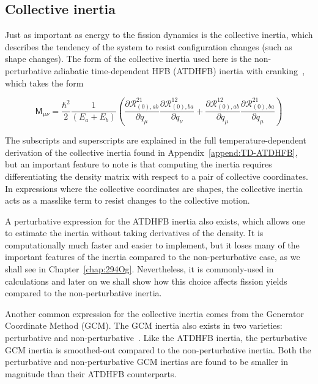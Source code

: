 \subsection{Collective inertia}
Just as important as energy to the fission dynamics is the collective inertia, which describes the tendency of the system to resist configuration changes (such as shape changes). The form of the collective inertia used here is the non-perturbative adiabatic time-dependent HFB (ATDHFB) inertia with cranking~\cite{Baran2011}, which takes the form

\begin{equation}\label{eq:mATDHFB-np}
\mathsf{M}_{\mu\nu} =  \frac{\hbar^2}{2}\frac{1}{(E_a+E_b)}\left(\frac{\partial\mathcal{R}^{21}_{(0),ab}}{\partial q_\mu}\frac{\partial\mathcal{R}^{12}_{(0),ba}}{\partial q_\nu}+\frac{\partial\mathcal{R}^{12}_{(0),ab}}{\partial q_\mu}\frac{\partial\mathcal{R}^{21}_{(0),ba}}{\partial q_\mu}\right)
\end{equation}

\noindent The subscripts and superscripts are explained in the full temperature-dependent derivation of the collective inertia found in Appendix~\ref{append:TD-ATDHFB}, but an important feature to note is that computing the inertia requires differentiating the density matrix with respect to a pair of collective coordinates. In expressions where the collective coordinates are shapes, the collective inertia acts as a masslike term to resist changes to the collective motion.

A perturbative expression for the ATDHFB inertia also exists, which allows one to estimate the inertia without taking derivatives of the density. It is computationally much faster and easier to implement, but it loses many of the important features of the inertia compared to the non-perturbative case, as we shall see in Chapter~\ref{chap:294Og}. Nevertheless, it is commonly-used in calculations and later on we shall show how this choice affects fission yields compared to the non-perturbative inertia.

Another common expression for the collective inertia comes from the Generator Coordinate Method (GCM). The GCM inertia also exists in two varieties: perturbative and non-perturbative~\cite{Giuliani2018b}. Like the ATDHFB inertia, the perturbative GCM inertia is smoothed-out compared to the non-perturbative inertia. Both the perturbative and non-perturbative GCM inertias are found to be smaller in magnitude than their ATDHFB counterparts.

